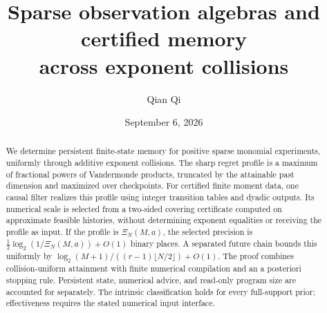 \documentclass[11pt]{amsart}
\title[Certified memory across exponent collisions]{Sparse observation algebras and certified memory\\ across exponent collisions}
\author{Qian Qi}
\date{September 6, 2026}
\theoremstyle{definition}\newtheorem{definition}[theorem]{Definition}
\theoremstyle{remark}\newtheorem{remark}[theorem]{Remark}
\begin{document}
\begin{abstract}
We determine persistent finite-state memory for positive sparse monomial
experiments, uniformly through additive exponent collisions. The sharp
regret profile is a maximum of fractional powers of Vandermonde products,
truncated by the attainable past dimension and maximized over checkpoints.
For certified finite moment data, one causal filter realizes this profile
using integer transition tables and dyadic outputs. Its numerical scale
is selected from a two-sided covering certificate computed on approximate
feasible histories, without determining exponent equalities or receiving
the profile as input. If the profile is $\Xi_N(M,a)$, the selected
precision is $\frac12\log_2(1/\Xi_N(M,a))+O(1)$ binary places.
A separated future chain bounds this uniformly by
$\log_2(M+1)/((r-1)\lfloor N/2\rfloor)+O(1)$.
The proof combines collision-uniform attainment with finite numerical
compilation and an a posteriori stopping rule. Persistent state, numerical
advice, and read-only program size are accounted for separately.
The intrinsic classification holds for every full-support prior;
effectiveness requires the stated numerical input interface.
\end{abstract}
\maketitle











\appendix








\end{document}
